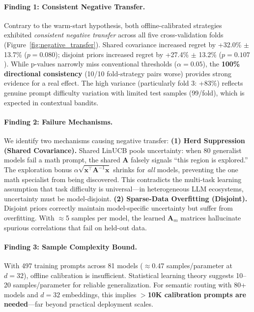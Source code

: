 \paragraph{Finding 1: Consistent Negative Transfer.} Contrary to the warm-start hypothesis, both offline-calibrated strategies exhibited \emph{consistent negative transfer} across all five cross-validation folds (Figure~\ref{fig:negative_transfer}). Shared covariance increased regret by +32.0\% $\pm$ 13.7\% ($p=0.080$); disjoint priors increased regret by +27.4\% $\pm$ 13.2\% ($p=0.107$). While p-values narrowly miss conventional thresholds ($\alpha=0.05$), the \textbf{100\% directional consistency} (10/10 fold-strategy pairs worse) provides strong evidence for a real effect. The high variance (particularly fold 3: +83\%) reflects genuine prompt difficulty variation with limited test samples (99/fold), which is expected in contextual bandits.

\paragraph{Finding 2: Failure Mechanisms.} We identify two mechanisms causing negative transfer: \textbf{(1) Herd Suppression (Shared Covariance).} Shared LinUCB pools uncertainty: when 80 generalist models fail a math prompt, the shared $\mathbf{A}$ falsely signals ``this region is explored.'' The exploration bonus $\alpha \sqrt{\mathbf{x}^\top \mathbf{A}^{-1} \mathbf{x}}$ shrinks for \emph{all} models, preventing the one math specialist from being discovered. This contradicts the multi-task learning assumption that task difficulty is universal---in heterogeneous LLM ecosystems, uncertainty must be model-disjoint. \textbf{(2) Sparse-Data Overfitting (Disjoint).} Disjoint priors correctly maintain model-specific uncertainty but suffer from overfitting. With $\approx$5 samples per model, the learned $\mathbf{A}_m$ matrices hallucinate spurious correlations that fail on held-out data.

\paragraph{Finding 3: Sample Complexity Bound.} With 497 training prompts across 81 models ($\approx$0.47 samples/parameter at $d=32$), offline calibration is insufficient. Statistical learning theory suggests 10--20 samples/parameter for reliable generalization. For semantic routing with 80+ models and $d=32$ embeddings, this implies \textbf{$>$10K calibration prompts are needed}---far beyond practical deployment scales.

